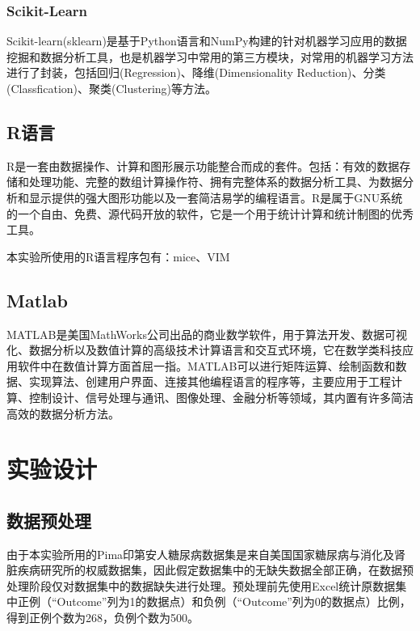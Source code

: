 \documentclass[a4paper]{ctexart}
\begin{document}
\subsubsection{Scikit-Learn}
Scikit-learn(sklearn)是基于Python语言和NumPy构建的针对机器学习应用的数据挖掘和数据分析工具，也是机器学习中常用的第三方模块，对常用的机器学习方法进行了封装，包括回归(Regression)、降维(Dimensionality Reduction)、分类(Classfication)、聚类(Clustering)等方法。

\subsection{R语言}
R是一套由数据操作、计算和图形展示功能整合而成的套件。包括：有效的数据存储和处理功能、完整的数组计算操作符、拥有完整体系的数据分析工具、为数据分析和显示提供的强大图形功能以及一套简洁易学的编程语言。R是属于GNU系统的一个自由、免费、源代码开放的软件，它是一个用于统计计算和统计制图的优秀工具。

本实验所使用的R语言程序包有：mice、VIM

\subsection{Matlab}
MATLAB是美国MathWorks公司出品的商业数学软件，用于算法开发、数据可视化、数据分析以及数值计算的高级技术计算语言和交互式环境，它在数学类科技应用软件中在数值计算方面首屈一指。MATLAB可以进行矩阵运算、绘制函数和数据、实现算法、创建用户界面、连接其他编程语言的程序等，主要应用于工程计算、控制设计、信号处理与通讯、图像处理、金融分析等领域，其内置有许多简洁高效的数据分析方法。


\section{实验设计}
\subsection{数据预处理}\label{sec:数据预处理}
由于本实验所用的Pima印第安人糖尿病数据集是来自美国国家糖尿病与消化及肾脏疾病研究所的权威数据集，因此假定数据集中的无缺失数据全部正确，在数据预处理阶段仅对数据集中的数据缺失进行处理。预处理前先使用Excel统计原数据集中正例（“Outcome”列为1的数据点）和负例（“Outcome”列为0的数据点）比例，得到正例个数为268，负例个数为500。
\end{document}

